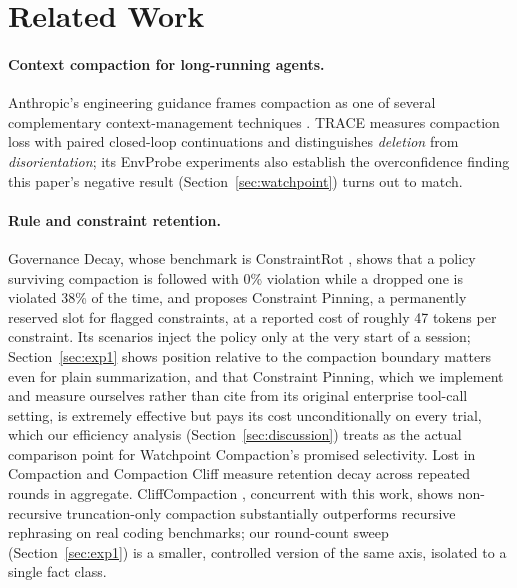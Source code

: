 \documentclass[11pt]{article}
\begin{document}
\section{Related Work}
\label{sec:related}

\paragraph{Context compaction for long-running agents.} Anthropic's engineering guidance frames compaction as one of several complementary context-management techniques \cite{anthropiccontext}. TRACE \cite{trace} measures compaction loss with paired closed-loop continuations and distinguishes \emph{deletion} from \emph{disorientation}; its EnvProbe experiments also establish the overconfidence finding this paper's negative result (Section~\ref{sec:watchpoint}) turns out to match.

\paragraph{Rule and constraint retention.} Governance Decay, whose benchmark is ConstraintRot \cite{governancedecay}, shows that a policy surviving compaction is followed with 0\% violation while a dropped one is violated 38\% of the time, and proposes Constraint Pinning, a permanently reserved slot for flagged constraints, at a reported cost of roughly 47 tokens per constraint. Its scenarios inject the policy only at the very start of a session; Section~\ref{sec:exp1} shows position relative to the compaction boundary matters even for plain summarization, and that Constraint Pinning, which we implement and measure ourselves rather than cite from its original enterprise tool-call setting, is extremely effective but pays its cost unconditionally on every trial, which our efficiency analysis (Section~\ref{sec:discussion}) treats as the actual comparison point for Watchpoint Compaction's promised selectivity. Lost in Compaction \cite{lostincompaction} and Compaction Cliff \cite{compactioncliff} measure retention decay across repeated rounds in aggregate. CliffCompaction \cite{cliffcompaction}, concurrent with this work, shows non-recursive truncation-only compaction substantially outperforms recursive rephrasing on real coding benchmarks; our round-count sweep (Section~\ref{sec:exp1}) is a smaller, controlled version of the same axis, isolated to a single fact class.
\end{document}
